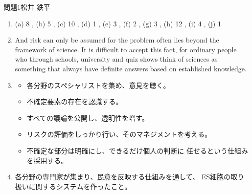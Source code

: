 \documentclass[fleqn]{jbook}
\begin{document}
\begin{answer}{問題1}{松井 鉄平}
\begin{enumerate}
\item (a) 8 , (b) 5 , (c) 10 , (d) 1 , (e) 3 , (f) 2 , (g) 3 , 
(h) 12 , (i) 4 , (j) 1

\item And risk can only be assumed for the problem often lies beyond 
the framework of science. It is difficult to accept this fact, for 
ordinary people who through schools, university and quiz shows 
think of sciences as something that always have definite answers based on 
established knowledge.

\item \begin{itemize}
\item 各分野のスペシャリストを集め、意見を聴く。
\item 不確定要素の存在を認識する。
\item すべての議論を公開し、透明性を増す。
\item リスクの評価をしっかり行い、そのマネジメントを考える。
\item 不確定な部分は明確にし、できるだけ個人の判断に
任せるという仕組みを採用する。
\end{itemize}

\item 各分野の専門家が集まり、民意を反映する仕組みを通して、
ES細胞の取り扱いに関するシステムを作ったこと。
\end{enumerate}
\end{answer}
\end{document}
